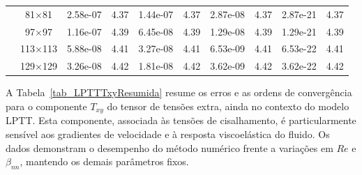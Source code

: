 \begin{table}[H]
{\begin{tabular*}{\textwidth}{@{\extracolsep\fill}c|c|cc|cc|cc|cc@{}}
                & 81$\times$81 & 2.58e-07 & 4.37 & 1.44e-07 & 4.37 & 2.87e-08 & 4.37 & 2.87e-21 & 4.37 \\
                & 97$\times$97 & 1.16e-07 & 4.39 & 6.45e-08 & 4.39 & 1.29e-08 & 4.39 & 1.29e-21 & 4.39 \\
                & 113$\times$113 & 5.88e-08 & 4.41 & 3.27e-08 & 4.41 & 6.53e-09 & 4.41 & 6.53e-22 & 4.41 \\
                & 129$\times$129 & 3.26e-08 & 4.42 & 1.81e-08 & 4.42 & 3.62e-09 & 4.42 & 3.62e-22 & 4.42 \\
                \bottomrule
            \end{tabular*}
	}{%
	\fdadospesquisa
	}
\end{table}

A Tabela~\ref{tab_LPTTTxyResumida} resume os erros e as ordens de convergência para o componente $T_{xy}$ do tensor de tensões extra, ainda no contexto do modelo LPTT. Esta componente, associada às tensões de cisalhamento, é particularmente sensível aos gradientes de velocidade e à resposta viscoelástica do fluido. Os dados demonstram o desempenho do método numérico frente a variações em $Re$ e $\beta_{nn}$, mantendo os demais parâmetros fixos.

